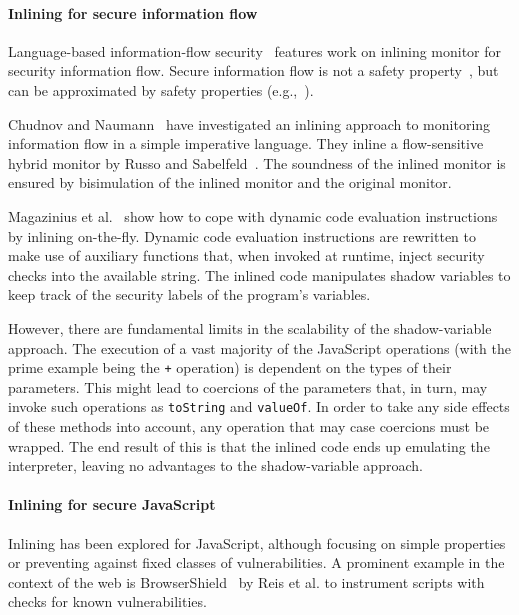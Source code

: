 \documentclass{llncs}
\begin{document}
\paragraph{Inlining for secure information flow}
Language-based information-flow security~\cite{Sabelfeld:Myers:JSAC}
features work on inlining monitor for security information flow.
Secure information flow is not
a safety property~\cite{McLean:SSP94}, but can be approximated by
safety properties
(e.g.,~\cite{Boudol:FAST08,Sabelfeld:Russo:PSI09,Austin:Flanagan:PLAS09}).

Chudnov and
Naumann~\cite{Chudnov:Naumann:CSF10} have investigated an inlining
approach to monitoring information flow in a simple imperative language. They inline a flow-sensitive
hybrid monitor by Russo and
Sabelfeld~\cite{Russo:Sabelfeld:CSF10}. The soundness of the inlined
monitor is ensured by bisimulation of the inlined monitor and the
original monitor.

Magazinius et
al.~\cite{Magazinius+:SEC10,DBLP:journals/compsec/MagaziniusRS12} show
how to cope with dynamic code evaluation instructions by inlining
on-the-fly. 
Dynamic code evaluation instructions are
rewritten to make use of auxiliary functions that, when invoked at
runtime, inject security checks into the available string. 
The inlined code manipulates shadow variables to keep track of the
security labels of the program's variables.

However, there are fundamental limits in the scalability of the shadow-variable
approach.  The execution of a vast majority of the JavaScript operations (with
the prime example being the \lstinline{+} operation) is dependent on the types
of their parameters.  This might lead to coercions of the parameters that, in
turn, may invoke such operations as \lstinline{toString} and \lstinline{valueOf}. In order to take
any side effects of these methods into account, any operation that may case
coercions must be wrapped. The end result of this is that the inlined code ends
up emulating the interpreter, leaving no advantages to the shadow-variable
approach.

\paragraph{Inlining for secure JavaScript}
Inlining has been explored for JavaScript, although focusing on
simple properties or preventing against fixed classes of vulnerabilities.
A prominent example in the context of the web is
BrowserShield~\cite{Reis+:TWeb07} by Reis et al. to instrument scripts with
checks for known vulnerabilities.
\end{document}
